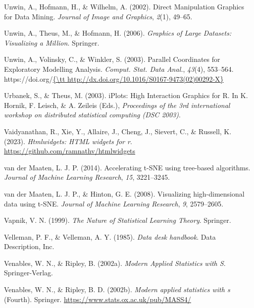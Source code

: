 \documentclass[
  letterpaper,
]{krantz}
\newlength{\cslhangindent}
\newenvironment{CSLReferences}[2] %
 {\begin{list}{}{%
  \setlength{\itemindent}{0pt}
  \setlength{\leftmargin}{0pt}
  \setlength{\parsep}{0pt}
  \ifodd #1
   \setlength{\leftmargin}{\cslhangindent}
   \setlength{\itemindent}{-1\cslhangindent}
  \fi
  \setlength{\itemsep}{#2\baselineskip}}}
 {\end{list}}
\begin{document}
\begin{CSLReferences}{1}{0}
Unwin, A., Hofmann, H., \& Wilhelm, A. (2002). Direct {M}anipulation
{G}raphics for {D}ata {M}ining. \emph{Journal of Image and Graphics},
\emph{2}(1), 49--65.

Unwin, A., Theus, M., \& Hofmann, H. (2006). \emph{Graphics of {L}arge
{D}atasets: {V}isualizing a {M}illion}. Springer.

Unwin, A., Volinsky, C., \& Winkler, S. (2003). Parallel {C}oordinates
for {E}xploratory {M}odelling {A}nalysis. \emph{Comput. Stat. Data
Anal.}, \emph{43}(4), 553--564.
https://doi.org/\href{\%7B/tt\%20http://dx.doi.org/10.1016/S0167-9473(02)00292-X\%7D}{\{\textbackslash tt
http://dx.doi.org/10.1016/S0167-9473(02)00292-X\}}

Urbanek, S., \& Theus, M. (2003). {iPlots}: {H}igh {I}nteraction
{G}raphics for {R}. In K. Hornik, F. Leisch, \& A. Zeileis (Eds.),
\emph{Proceedings of the 3rd international workshop on distributed
statistical computing (DSC 2003)}.

Vaidyanathan, R., Xie, Y., Allaire, J., Cheng, J., Sievert, C., \&
Russell, K. (2023). \emph{Htmlwidgets: HTML widgets for r}.
\url{https://github.com/ramnathv/htmlwidgets}

van der Maaten, L. J. P. (2014). Accelerating t-SNE using tree-based
algorithms. \emph{Journal of Machine Learning Research}, \emph{15},
3221--3245.

van der Maaten, L. J. P., \& Hinton, G. E. (2008). Visualizing
high-dimensional data using t-SNE. \emph{Journal of Machine Learning
Research}, \emph{9}, 2579--2605.

Vapnik, V. N. (1999). \emph{The {N}ature of {S}tatistical {L}earning
{T}heory}. Springer.

Velleman, P. F., \& Velleman, A. Y. (1985). \emph{Data desk handbook}.
Data Description, Inc.

Venables, W. N., \& Ripley, B. (2002a). \emph{Modern {A}pplied
{S}tatistics with {S}}. Springer-Verlag.

Venables, W. N., \& Ripley, B. D. (2002b). \emph{Modern applied
statistics with s} (Fourth). Springer.
\url{https://www.stats.ox.ac.uk/pub/MASS4/}


\end{CSLReferences}
\end{document}
